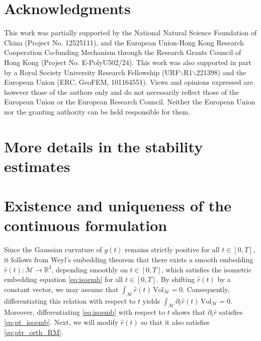 \documentclass[11pt,a4paper,oneside,reqno]{amsart}
\theoremstyle{definition}
\theoremstyle{plain}
\numberwithin{theorem}{section}
\numberwithin{proposition}{section}
\numberwithin{lemma}{section}
\numberwithin{equation}{section}
\newcommand{\Man}{\mathcal{M}}
\newcommand{\Vol}{\mathrm{Vol}}
\begin{document}
\section*{Acknowledgments}
This work was partially supported by the National Natural Science Foundation of China (Project No. 12525111), and the European Union-Hong Kong Research Cooperation Co-funding Mechanism through the Research Grants Council of Hong Kong (Project No. E-PolyU502/24). 
This work was also supported in part by a Royal Society University Research Fellowship (URF$\backslash$R1$\backslash$221398) and the European Union (ERC, GeoFEM, 101164551).  Views and opinions expressed are however those of the authors only and do not necessarily reflect those of the European Union or the European Research Council. Neither the European Union nor the granting authority can be held responsible for them. 





        
        
\newpage
\appendix
\renewcommand{\thesection}{Appendix}
\section*{More details in the stability estimates} \label{appendix}
\setcounter{section}{0}
\renewcommand{\theequation}{A.\arabic{equation}}
\renewcommand{\thesection}{Appendix \Alph{section}}
\setcounter{equation}{0}

\section{Existence and uniqueness of the continuous formulation}\label{appendix:Wely-emb}


Since the Gaussian curvature of $g(t)$ remains strictly positive for all $t \in [0,T]$, 
it follows from Weyl's embedding theorem \cite[Theorem 9.0.1]{han2006isometric} 
that there exists a smooth embedding 
$\hat r(t): \Man \rightarrow \mathbb{R}^3$, depending smoothly on $t \in [0,T]$, 
which satisfies the isometric embedding equation \eqref{eq:isoemb} for all $t \in [0,T]$. 
By shifting $\hat r(t)$ by a constant vector, we may assume that 
$\int_{\Man} \hat r(t)\, \Vol_{\Man} = 0$. 
Consequently, differentiating this relation with respect to $t$ yields 
$\int_{\Man} \partial_t \hat r(t)\, \Vol_{\Man} = 0$. 
Moreover, differentiating \eqref{eq:isoemb} with respect to $t$ shows that 
$\partial_t \hat r$ satisfies \eqref{eq:pt_isoemb}. 
Next, we will modify $\hat r(t)$ so that it also satisfies \eqref{eq:ptr_orth_RM}.
\end{document}
